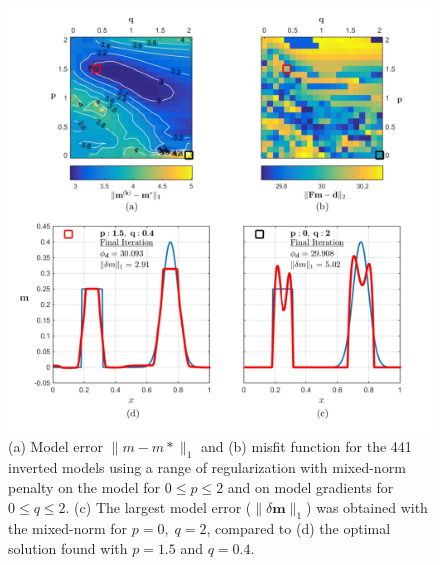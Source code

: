 \begin{figure}[p]
\centering
\includegraphics[scale=0.62]{1D_Results_ALL}
\caption{(a) Model error $\| m - m{*}\|_1$ and (b) misfit function for the 441 inverted models using a range of regularization with mixed-norm penalty on the model for $0 \leq p \leq 2$ and on model gradients for $0 \leq q \leq 2$. (c) The largest model error ($\| \delta \mathbf{m}\|_1$) was obtained with the mixed-norm for $p=0,\;q=2$, compared to (d) the optimal solution found with $p=1.5$ and $q=0.4$.}
\label{fig:1D_Results_ALL}
\end{figure}

